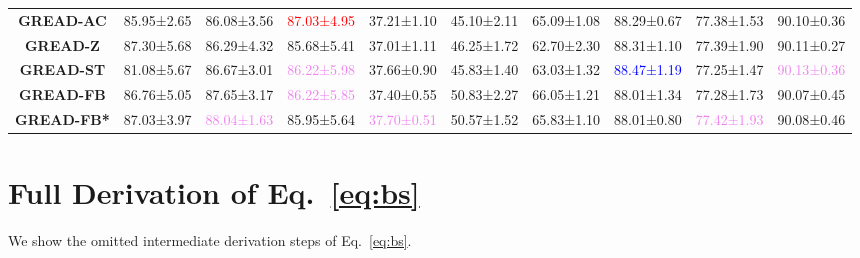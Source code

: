 \documentclass{article}
\theoremstyle{plain}
\theoremstyle{definition}
\theoremstyle{remark}
\newcommand{\std}{\scriptsize{}}
\newcommand{\BEST}[1]{\textcolor{red}{#1}}
\newcommand{\SECOND}[1]{\textcolor{blue}{#1}}
\newcommand{\THIRD}[1]{\textcolor{violet}{#1}}
\begin{document}
\begin{table}[ht]
\begin{tabular}{c ccccccccc}
        \textbf{GREAD-AC}
                    & 85.95\std{±2.65} & 86.08\std{±3.56} & \BEST{87.03\std{±4.95}} 
                    & 37.21\std{±1.10} & 45.10\std{±2.11} & 65.09\std{±1.08} 
                    & 88.29\std{±0.67} & 77.38\std{±1.53} & 90.10\std{±0.36}\\
        \textbf{GREAD-Z} 
                    & 87.30\std{±5.68} & 86.29\std{±4.32} & 85.68\std{±5.41} 
                    & 37.01\std{±1.11} & 46.25\std{±1.72} & 62.70\std{±2.30} 
                    & 88.31\std{±1.10} & 77.39\std{±1.90} & 90.11\std{±0.27}\\
        \textbf{GREAD-ST} 
                        & 81.08\std{±5.67} & 86.67\std{±3.01} & \THIRD{86.22\std{±5.98}}
                        & 37.66\std{±0.90} & 45.83\std{±1.40} & 63.03\std{±1.32} 
                        & \SECOND{88.47\std{±1.19}} & 77.25\std{±1.47} & \THIRD{90.13\std{±0.36}}\\
        \textbf{GREAD-FB}   
                        & 86.76\std{±5.05} & 87.65\std{±3.17} & \THIRD{86.22\std{±5.85}} 
                        & 37.40\std{±0.55} & 50.83\std{±2.27} & 66.05\std{±1.21} 
                        & 88.01\std{±1.34} & 77.28\std{±1.73} & 90.07\std{±0.45}\\
        \textbf{GREAD-FB*}   
                        & 87.03\std{±3.97} & \THIRD{88.04\std{±1.63}} & 85.95\std{±5.64} 
                        & \THIRD{37.70\std{±0.51}} & 50.57\std{±1.52} & 65.83\std{±1.10} 
                        & 88.01\std{±0.80} & \THIRD{77.42\std{±1.93}} &  90.08\std{±0.46}\\
\bottomrule
    \end{tabular}
    \label{tab:result_full}
\end{table}

\pagebreak

\section{Full Derivation of Eq.~\eqref{eq:bs}}\label{a:bs}
We show the omitted intermediate derivation steps of Eq.~\eqref{eq:bs}.
\end{document}
